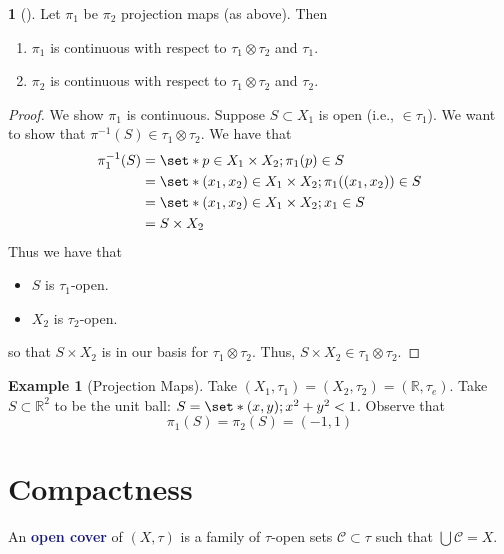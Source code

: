 \documentclass[11pt]{article}
\numberwithin{equation}{section}
\newcommand{\navy}[1]{\textcolor{MidnightBlue}{\bf #1}}
\newcounter{theo}[section]\setcounter{theo}{0}
\theoremstyle{definition}
\newtheorem{claim}{\color{ForestGreen}{\textbf{Claim}}}[section]
\theoremstyle{definition}
\newtheorem{example}{\color{WildStrawberry}Example}[section]
\def\Set{\set*}%
\def\ss{\subset}
\newcommand{\1}{\mathbbm 1}
\def\t{\tau}
\newcommand{\RR}{\mathbb R}
\newcommand{\cC}{\mathcal C}
\begin{document}
\begin{claim}[]
	Let $\pi_1$ be $\pi_2$ projection maps (as above). Then
	\begin{enumerate}
		\item $\pi_1$ is continuous with respect to $\t_1 \otimes \t_2$ and $\t_1$.
		\item $\pi_2$ is continuous with respect to $\t_1 \otimes \t_2$ and $\t_2$.
	\end{enumerate}
\end{claim}
\begin{proof}
	We show $\pi_1$ is continuous. Suppose $S \ss X_1$ is open (i.e., $\in \t_1$). We want to show that $\pi^{-1}(S) \in \t_1 \otimes \t_2$. We have that
	\begin{align*}
		\pi_1^{-1}(S) &= \Set{p \in X_1 \times X_2; \pi_1(p) \in S} \\
		&= \Set{(x_1, x_2) \in X_1 \times X_2; \pi_1((x_1,x_2)) \in S} \\
		&= \Set{(x_1, x_2) \in X_1 \times X_2; x_1 \in S} \\
		&= S \times X_2
	\end{align*}
	Thus we have that
	\begin{itemize}
		\item $S$ is $\t_1$-open.
		\item $X_2$ is $\t_2$-open.
	\end{itemize}
	so that $S \times X_2$ is in our basis for $\t_1 \otimes \t_2$. Thus, $S \times X_2 \in \t_1 \otimes \t_2$.
	
\end{proof}


\begin{example}[Projection Maps]
	Take $(X_1,\t_1) = (X_2,\t_2) = (\RR, \t_e)$. Take $S \ss \RR^2$ to be the unit ball: $S = \Set{(x,y);x^2 + y^2 <1}$. Observe that
	\begin{equation}
		\pi_1(S) = \pi_2(S) = (-1,1)
	\end{equation}
\end{example}


\section{Compactness}

\begin{definition}
	An \navy{open cover} of $(X,\t)$ is a family of $\t$-open sets $\cC \ss \t$ such that $\bigcup \cC = X$. 
\end{definition}
\end{document}
